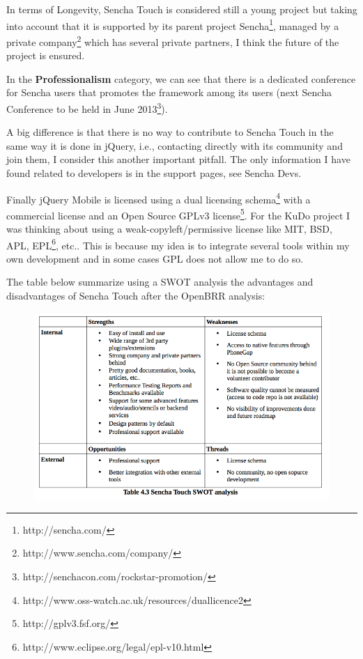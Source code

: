 \documentclass[a4paper,12pt]{book}
\begin{document}
In terms of Longevity, Sencha Touch is considered still a young project but taking into account that it is supported by its parent project Sencha\footnote{http://sencha.com/}, managed by a private company\footnote{http://www.sencha.com/company/}  which has several private partners, I think the future of the project is ensured.

In the \textbf{Professionalism} category, we can see that there is a dedicated conference for Sencha users\cite{sencha Conferences} that promotes the framework among its users  (next Sencha Conference to be held in June 2013\footnote{http://senchacon.com/rockstar-promotion/}).

A big difference is that there is no way to contribute to Sencha Touch in the same way it is done in jQuery, i.e., contacting directly with its community and join them, I consider this another important pitfall. The only information I have found related to developers is in the support pages, see Sencha Devs\cite{sencha Devs}.  

Finally jQuery Mobile is licensed using a dual licensing schema\footnote{http://www.oss-watch.ac.uk/resources/duallicence2}  with a commercial license and an Open Source GPLv3 license\footnote{http://gplv3.fsf.org/}. For the KuDo project I was thinking about using a weak-copyleft/permissive license like MIT, BSD, APL, EPL\footnote{http://www.eclipse.org/legal/epl-v10.html}, etc.. This is because my idea is to integrate several tools within my own development and in some cases GPL does not allow me to do so. 

The table below summarize using a SWOT analysis the advantages and disadvantages of Sencha Touch after the OpenBRR analysis:

\begin{figure}[H]
    \centering
    \includegraphics[width=12cm, keepaspectratio]{img/table43.png}
 \end{figure}
\end{document}
